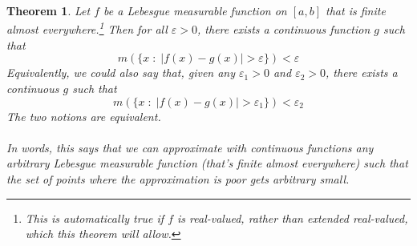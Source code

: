 \documentclass[12pt]{article}
\theoremstyle{plain}
\newtheorem{thm}{Theorem}[subsection]
\theoremstyle{definition}
\theoremstyle{remark}
\begin{document}
\begin{thm} 
Let $f$ be a Lebesgue measurable function on $[a,b]$ that is finite almost everywhere.\footnote{This is automatically true if $f$ is real-valued, rather than extended real-valued, which this theorem will allow.} Then for all $\varepsilon>0$, there exists a continuous function $g$ such that 
\begin{equation}
    \label{contapprox}
    m\left(\{x \; : \; |f(x)-g(x)|>\varepsilon\}\right)
    <\varepsilon
\end{equation}
Equivalently, we could also say that, given any $\varepsilon_1>0$ and $\varepsilon_2>0$, there exists a continuous $g$ such that 
\[
    m\left(\{x \; : \; |f(x)-g(x)|>\varepsilon_1\}\right)
    <\varepsilon_2
\]
The two notions are equivalent.
\\
\\
In words, this says that we can approximate with continuous functions any arbitrary Lebesgue measurable function (that's finite almost everywhere) such that the set of points where the approximation is poor gets arbitrary small. 
\end{thm}
\end{document}
